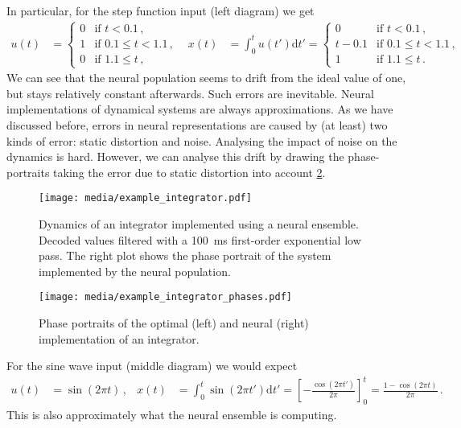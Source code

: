 \documentclass[10pt,letterpaper,oneside]{article}
\begin{document}
In particular, for the step function input (left diagram) we get
\begin{align*}
	u(t) &= \begin{cases}
		0 & \text{if } t < 0.1 \,, \\
		1 & \text{if } 0.1 \leq t < 1.1 \,, \\
		0 & \text{if } 1.1 \leq t \,,
		\end{cases} &
	x(t) &= \int_{0}^t u(t') \mathrm{d}t' = \begin{cases}
		0 & \text{if } t < 0.1 \,, \\
		t - 0.1 & \text{if } 0.1 \leq t < 1.1 \,, \\
		1 & \text{if } 1.1 \leq t \,.
	\end{cases}
\end{align*}
We can see that the neural population seems to drift from the ideal value of one, but stays relatively constant afterwards. Such errors are inevitable. Neural implementations of dynamical systems are always approximations. As we have discussed before, errors in neural representations are caused by (at least) two kinds of error: static distortion and noise. Analysing the impact of noise on the dynamics is hard. However, we can analyse this drift by drawing the phase-portraits taking the error due to static distortion into account \cref{fig:example_integrator_phases}.

\begin{figure}
	\centering
	\texttt{[image: media/example\_integrator.pdf]}
	\caption{Dynamics of an integrator implemented using a neural ensemble. Decoded values filtered with a \SI{100}{\milli\second} first-order exponential low pass. The right plot shows the phase portrait of the system implemented by the neural population.  }
	\label{fig:example_integrator}
\end{figure}


\begin{figure}
	\centering
	\texttt{[image: media/example\_integrator\_phases.pdf]}
	\caption{Phase portraits of the optimal (left) and neural (right) implementation of an integrator. }
	\label{fig:example_integrator_phases}
\end{figure}

For the sine wave input (middle diagram) we would expect
\begin{align*}
	u(t) &= \sin(2 \pi t) \,, &
	x(t) &= \int_{0}^t \sin(2 \pi t') \mathrm{d}t' = \left[ -\frac{\cos(2 \pi t')}{2 \pi}  \right]_0^t = \frac{1 - \cos(2 \pi t)}{2 \pi} \,.
\end{align*}
This is also approximately what the neural ensemble is computing.
\end{document}

